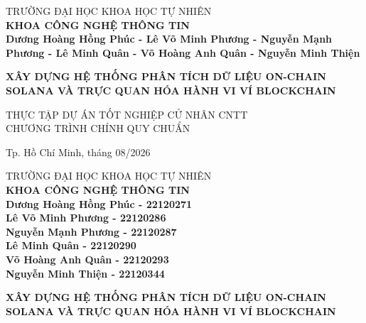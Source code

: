 \begin{titlepage}

\begin{center}
TRƯỜNG ĐẠI HỌC KHOA HỌC TỰ NHIÊN\\
\textbf{KHOA CÔNG NGHỆ THÔNG TIN}\\[2cm]


{ \Large \bfseries Dương Hoàng Hồng Phúc - Lê Võ Minh Phương - Nguyễn Mạnh Phương - Lê Minh Quân - Võ Hoàng Anh Quân - Nguyễn Minh Thiện\\[2cm] } 

{ \Large \bfseries XÂY DỰNG HỆ THỐNG PHÂN TÍCH DỮ
LIỆU ON-CHAIN SOLANA VÀ TRỰC QUAN
HÓA HÀNH VI VÍ BLOCKCHAIN \\[3cm]} 


\large THỰC TẬP DỰ ÁN TỐT NGHIỆP CỬ NHÂN CNTT\\
\large CHƯƠNG TRÌNH CHÍNH QUY CHUẨN\\



\vfill
Tp. Hồ Chí Minh, tháng 08/2026

\end{center}

\pagebreak

\thispagestyle{empty}



\begin{center}

TRƯỜNG ĐẠI HỌC KHOA HỌC TỰ NHIÊN\\
\textbf{KHOA CÔNG NGHỆ THÔNG TIN}\\[2cm]


{\large \bfseries Dương Hoàng Hồng Phúc - 22120271\\
            Lê Võ Minh Phương - 22120286\\
            Nguyễn Mạnh Phương - 22120287\\
            Lê Minh Quân - 22120290\\
            Võ Hoàng Anh Quân - 22120293\\
            Nguyễn Minh Thiện - 22120344\\} 


{ \Large \bfseries XÂY DỰNG HỆ THỐNG PHÂN TÍCH DỮ
LIỆU ON-CHAIN SOLANA VÀ TRỰC QUAN
HÓA HÀNH VI VÍ BLOCKCHAIN \\[2cm]}  



\end{center}
\end{titlepage}
